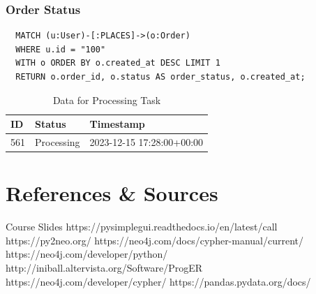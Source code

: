 \documentclass[a4paper,12pt]{article}
\begin{document}
\subsubsection{Order Status}
\begin{verbatim}
  MATCH (u:User)-[:PLACES]->(o:Order)
  WHERE u.id = "100"
  WITH o ORDER BY o.created_at DESC LIMIT 1
  RETURN o.order_id, o.status AS order_status, o.created_at;
\end{verbatim}
\begin{table}[h!]
  \centering
  \caption{Data for Processing Task}
  \label{tab:processing_data}
  \begin{tabular}{l l l}
      \toprule
      \textbf{ID} & \textbf{Status} & \textbf{Timestamp} \\
      \midrule
      561 & Processing & 2023-12-15 17:28:00+00:00 \\
      \bottomrule
  \end{tabular}
\end{table}

\newpage
\section{References \& Sources}
  \begin{thebibliography}{9}
    \bibitem{} Course Slides
    \bibitem{} https://pysimplegui.readthedocs.io/en/latest/call%
    \bibitem{} https://py2neo.org/
    \bibitem{} https://neo4j.com/docs/cypher-manual/current/
    \bibitem{} https://neo4j.com/developer/python/
    \bibitem{} http://iniball.altervista.org/Software/ProgER
    \bibitem{} https://neo4j.com/developer/cypher/
    \bibitem{} https://pandas.pydata.org/docs/
  \end{thebibliography}
\end{document}
